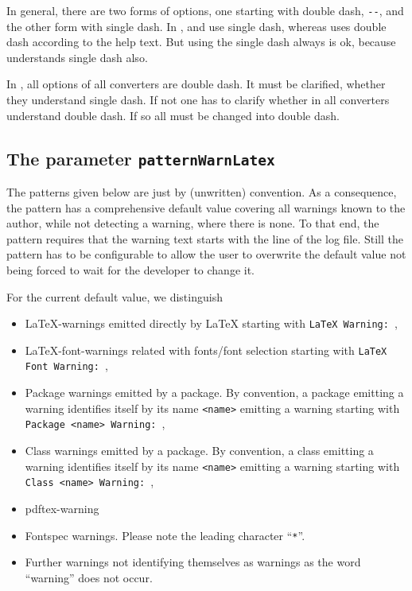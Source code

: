 In general, there are two forms of options, one starting with double dash, \texttt{-{}-}, 
and the other form with single dash. 
In \texlive, \pdflatex{} and \xelatex{} use single dash, 
whereas \lualatex{} uses double dash according to the help text. 
But using the single dash always is ok, 
because \lualatex{} understands single dash also. 

In \miktex, all options of all converters are double dash. 
It must be clarified, whether they understand single dash. 
If not one has to clarify whether in \texlive{} all converters understand double dash. 
If so all must be changed into double dash. 


\subsection{The parameter \texttt{patternWarnLatex}}%
\label{subsec:patternWarnLatex}

The patterns given below are just by (unwritten) convention. 
As a consequence, the pattern has a comprehensive default value 
covering all warnings known to the author, 
while not detecting a warning, where there is none. 
To that end, the pattern requires 
that the warning text starts with the line of the log file. 
Still the pattern has to be configurable 
to allow the user to overwrite the default value 
not being forced to wait for the developer 
to change it. 

For the current default value, we distinguish 
%
\begin{itemize}
\item
\LaTeX-warnings emitted directly by \LaTeX{} 
starting with \texttt{LaTeX Warning: }, 
\item
\LaTeX-font-warnings related with fonts/font selection 
starting with \texttt{LaTeX Font Warning: }, 
\item
Package warnings emitted by a package. 
By convention, a package emitting a warning identifies itself 
by its name \texttt{<name>}
emitting a warning starting with \texttt{Package <name> Warning: }, 
\item
Class warnings emitted by a package. 
By convention, a class emitting a warning identifies itself 
by its name \texttt{<name>}
emitting a warning starting with \texttt{Class <name> Warning: }, 
\item
pdftex-warning 
\item
Fontspec warnings. Please note the leading character ``\texttt{*}''. 
\item
Further warnings not identifying themselves as warnings 
as the word ``warning'' does not occur. 
\end{itemize}

